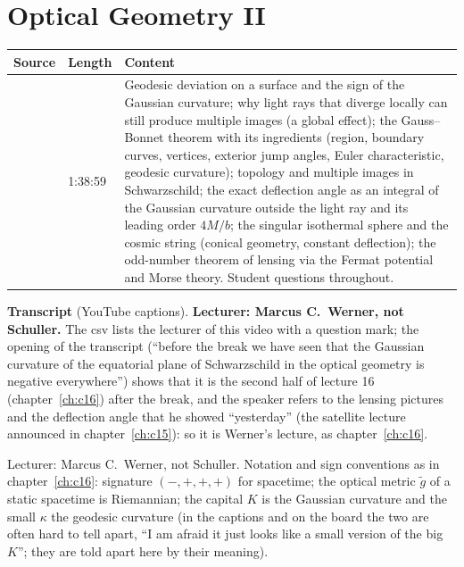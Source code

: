 \chapter{Optical Geometry II}\label{ch:c17}
\begin{paracol}{2}

\begin{sources}
\begin{tabularx}{\linewidth}{@{}l l L@{}}
\toprule
\textbf{Source} & \textbf{Length} & \textbf{Content}\\
\midrule
{} & 1:38:59 & Geodesic deviation on a surface and the sign of the Gaussian curvature; why light rays that diverge locally can still produce multiple images (a global effect); the Gauss--Bonnet theorem with its ingredients (region, boundary curves, vertices, exterior jump angles, Euler characteristic, geodesic curvature); topology and multiple images in Schwarzschild; the exact deflection angle as an integral of the Gaussian curvature outside the light ray and its leading order $4M/b$; the singular isothermal sphere and the cosmic string (conical geometry, constant deflection); the odd-number theorem of lensing via the Fermat potential and Morse theory. Student questions throughout.\\
\bottomrule
\end{tabularx}

\smallskip
\textbf{Transcript}  (YouTube captions). \textbf{Lecturer: Marcus C.\ Werner, not Schuller.} The csv lists the lecturer of this video with a question mark; the opening of the transcript (``before the break we have seen that the Gaussian curvature of the equatorial plane of Schwarzschild in the optical geometry is negative everywhere'') shows that it is the second half of lecture 16 (chapter~\ref{ch:c16}) after the break, and the speaker refers to the lensing pictures and the deflection angle that he showed ``yesterday'' (the satellite lecture announced in chapter~\ref{ch:c15}): so it is Werner's lecture, as chapter~\ref{ch:c16}.
\end{sources}

\begin{coursenote}[Lecturer]
Lecturer: Marcus C.\ Werner, not Schuller. Notation and sign conventions as in chapter~\ref{ch:c16}: signature $(-,+,+,+)$ for spacetime; the optical metric $\tilde g$ of a static spacetime is Riemannian; the capital $K$ is the Gaussian curvature and the small $\kappa$ the geodesic curvature (in the captions and on the board the two are often hard to tell apart, ``I am afraid it just looks like a small version of the big $K$''; they are told apart here by their meaning).
\end{coursenote}


\end{paracol}
